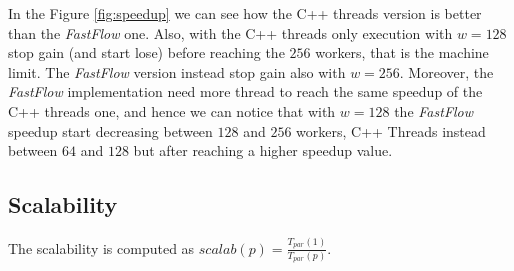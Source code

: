 \bigskip\noindent
In the Figure \ref{fig:speedup} we can see how the C++ threads version is better than the \textit{FastFlow} one. Also, with the C++ threads only execution with $w = 128$ stop gain (and start lose) before reaching the $256$ workers, that is the machine limit. The \textit{FastFlow} version instead stop gain also with $w = 256$. Moreover, the \textit{FastFlow} implementation need more thread to reach the same speedup of the C++ threads one, and hence we can notice that with $w = 128$ the \textit{FastFlow} speedup start decreasing between $128$ and $256$ workers, C++ Threads instead between $64$ and $128$ but after reaching a higher speedup value.



\subsection{Scalability}
The scalability is computed as $scalab(p) = \frac{T_{par}(1)}{T_{par}(p)}$.


